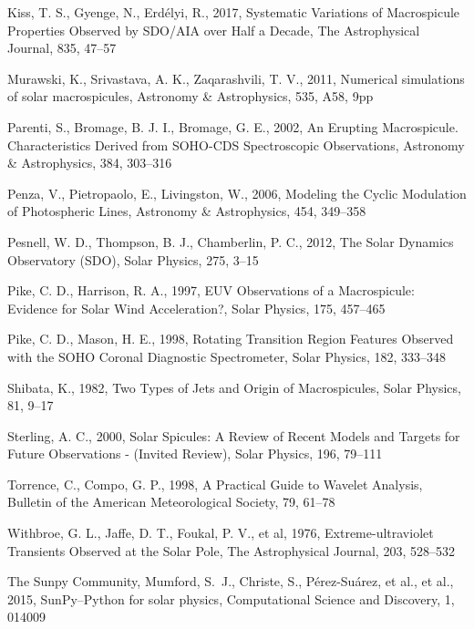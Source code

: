 \documentclass[final,authoryear,5p]{elsarticle}
\begin{document}
\begin{thebibliography}{99}
 Kiss, T. S., Gyenge, N., Erd\'elyi, R., 2017, Systematic Variations of Macrospicule Properties Observed by SDO/AIA over Half a Decade, The Astrophysical Journal, 835, 47--57

 Murawski, K., Srivastava, A. K., Zaqarashvili, T. V., 2011, Numerical simulations of solar macrospicules, Astronomy \& Astrophysics, 535, A58, 9pp

 Parenti, S., Bromage, B. J. I., Bromage, G. E., 2002, An Erupting Macrospicule. Characteristics Derived from SOHO-CDS Spectroscopic Observations, Astronomy \& Astrophysics, 384, 303--316

 Penza, V., Pietropaolo, E., Livingston, W., 2006, Modeling the Cyclic Modulation of Photospheric Lines, Astronomy \& Astrophysics, 454, 349--358 

 Pesnell, W. D., Thompson, B. J., Chamberlin, P. C., 2012, The Solar Dynamics Observatory (SDO), Solar Physics, 275, 3--15 

  Pike, C. D., Harrison, R. A., 1997, EUV Observations of a Macrospicule: Evidence for Solar Wind Acceleration?, Solar Physics, 175, 457--465

 Pike, C. D., Mason, H. E., 1998, Rotating Transition Region Features Observed with the SOHO Coronal Diagnostic Spectrometer, Solar Physics, 182, 333--348

 Shibata, K., 1982, Two Types of Jets and Origin of Macrospicules, Solar Physics, 81, 9--17

 Sterling, A. C., 2000, Solar Spicules: A Review of Recent Models and Targets for Future Observations - (Invited Review), Solar Physics, 196, 79--111

 Torrence, C., Compo, G. P., 1998, A Practical Guide to Wavelet Analysis, Bulletin of the American Meteorological Society, 79, 61--78

 Withbroe, G. L., Jaffe, D. T., Foukal, P. V., et al, 1976, Extreme-ultraviolet Transients Observed at the Solar Pole, The Astrophysical Journal, 203, 528--532

 The Sunpy Community, Mumford, S.~J., Christe, S., P{\'e}rez-Su{\'a}rez, et al., et al., 2015, SunPy--Python for solar physics, Computational Science and Discovery, 1, 014009

\end{thebibliography}
\end{document}
